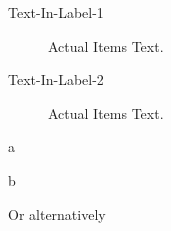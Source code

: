 %
%
%
%
%
%
{\setcounter{enumi}{0}
\renewcommand{\descriptionlabel}[1]{\hspace{\labelsep}\normalfont\textit{(\stepcounter{enumi}\roman{enumi}) #1}:}
\begin{description}
\item[Text-In-Label-1]%
    Actual Items Text.
\item[Text-In-Label-2]%
    Actual Items Text.
\end{description}}
%
%
%
\begin{enumerate*}[label=\textit{(\roman*)}]
\item%
    a
\item%
    b
\end{enumerate*}
%
%
%
%
%
%
%
Or alternatively
%
%
%
%
%
%
%
%
%
\renewcommand{\descriptionlabel}[1]{\hspace{\labelsep}\normalfont\textbf{#1}:}%
